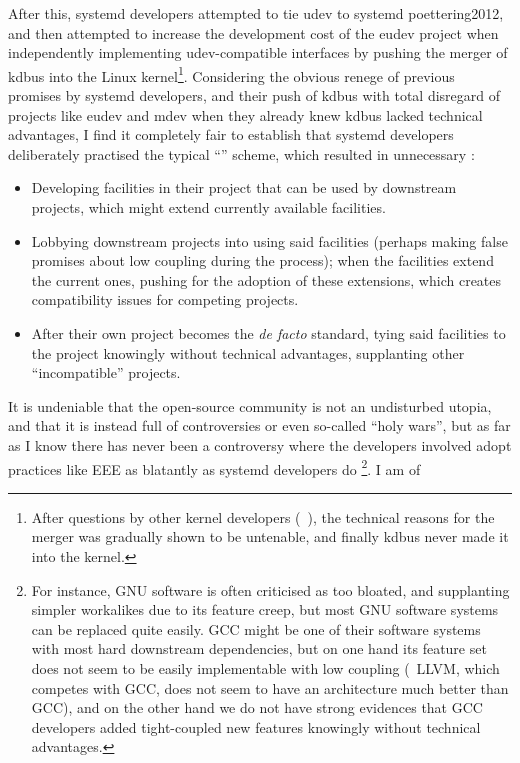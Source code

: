 After this, systemd developers attempted to tie udev to systemd\cupercite%
{poettering2012}, and then attempted to increase the development cost of the
eudev project when independently implementing udev-compatible interfaces%
 by pushing the merger of kdbus into the Linux
kernel\footnote{After questions by other kernel developers (\eg~\parencite%
{lutomirski2015}), the technical reasons for the merger
was gradually shown to be untenable, and finally kdbus never made it into the
kernel.}.  Considering the obvious renege of previous promises by systemd
developers, and their push of kdbus
with total disregard of projects like eudev and mdev when they already knew
kdbus lacked technical advantages, I find it completely
fair to establish that systemd developers deliberately practised the typical
``'' scheme,
which resulted in unnecessary :
\begin{itemize}
\item Developing facilities in their project that can be used by downstream
	projects, which might extend currently available facilities.
\item Lobbying downstream projects into using said facilities (perhaps making
	false promises about low coupling during the process); when the facilities
	extend the current ones, pushing for the adoption of these extensions,
	which creates compatibility issues for competing projects.
\item After their own project becomes the \emph{de facto} standard, tying
	said facilities to the project knowingly without technical advantages,
	supplanting other ``incompatible'' projects.
\end{itemize}
It is undeniable that the open-source community is not an undisturbed utopia,
and that it is instead full of controversies or even so-called ``holy wars'',
but as far as I know there has never been a controversy where the developers
involved adopt practices like EEE as blatantly as systemd developers do%
\footnote{For instance, GNU software is often criticised as too bloated, and
supplanting simpler workalikes due to its feature creep, but most GNU software
systems can be replaced quite easily.  GCC might be one of their software
systems with most hard downstream dependencies, but on one hand its feature set
does not seem to be easily implementable with low coupling (\eg~LLVM, which
competes with GCC, does not seem to have an architecture much better than GCC),
and on the other hand we do not have strong evidences that GCC developers added
tight-coupled new features knowingly without technical advantages.}.  I am of
